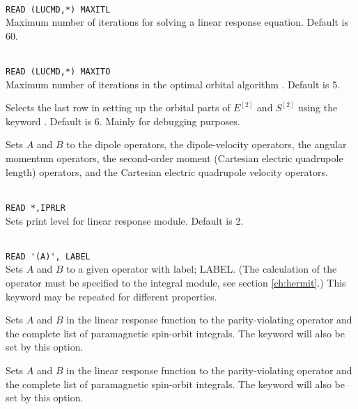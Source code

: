 \begin{description}
\item{}\\
\verb|READ (LUCMD,*) MAXITL|\\
Maximum number of iterations for solving a linear response
equation. Default is 60.

\item{}\\
\verb|READ (LUCMD,*) MAXITO|\\
Maximum number of iterations in the optimal orbital
algorithm
\cite{tuhjahjajpjjcp84}.
Default is 5.

\item{} Selects the last row in setting up the orbital
  parts of $E^{\left[2\right]}$
  and $S^{\left[2\right]}$ using the keyword . Default is
  6. Mainly for debugging purposes.

\item{}
Sets $A$ and $B$ to the dipole operators,
the dipole-velocity operators,
the angular momentum operators,
the second-order moment (Cartesian electric quadrupole
length) operators, and
the Cartesian electric quadrupole velocity operators.

\item{}\\
\verb|READ *,IPRLR|\\
Sets print level for linear response module. Default is 2.

\item{}\\
\verb|READ '(A)', LABEL|\\
Sets $A$ and $B$ to a given operator with label; LABEL.
(The calculation of the operator must be specified to the integral
module, see section \ref{ch:hermit}.)
This keyword may be repeated for different properties.

\item{} Sets $A$ and $B$ in the linear response function
  to the parity-violating operator and the complete list of
  paramagnetic spin-orbit integrals. The  keyword will
  also be set by this option.

\item{} Sets $A$ and $B$ in the linear response function
  to the parity-violating operator and the complete list of
  paramagnetic spin-orbit integrals. The  keyword will
  also be set by this option.


\end{description}
